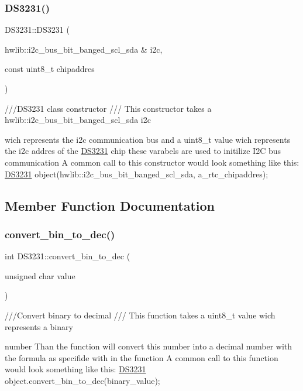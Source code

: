\subsubsection{\texorpdfstring{D\+S3231()}{DS3231()}}
{\footnotesize\ttfamily D\+S3231\+::\+D\+S3231 (\begin{DoxyParamCaption}\item[{hwlib\+::i2c\+\_\+bus\+\_\+bit\+\_\+banged\+\_\+scl\+\_\+sda \&}]{i2c,  }\item[{const uint8\+\_\+t}]{chipaddres }\end{DoxyParamCaption})}



///\+D\+S3231 class constructor  /// This constructor takes a hwlib\+::i2c\+\_\+bus\+\_\+bit\+\_\+banged\+\_\+scl\+\_\+sda i2c 

wich represents the i2c communication bus and a uint8\+\_\+t value wich represents the i2c addres of the \hyperlink{classDS3231}{D\+S3231} chip these varabels are used to initilize I2C bus communication A common call to this constructor would look something like this\+: \hyperlink{classDS3231}{D\+S3231} object(hwlib\+::i2c\+\_\+bus\+\_\+bit\+\_\+banged\+\_\+scl\+\_\+sda, a\+\_\+rtc\+\_\+chipaddres); 

\subsection{Member Function Documentation}
\mbox{\label{classDS3231_a505df2184898f9773d41ae8fde8e647a}} 
\subsubsection{\texorpdfstring{convert\+\_\+bin\+\_\+to\+\_\+dec()}{convert\_bin\_to\_dec()}}
{\footnotesize\ttfamily int D\+S3231\+::convert\+\_\+bin\+\_\+to\+\_\+dec (\begin{DoxyParamCaption}\item[{unsigned char}]{value }\end{DoxyParamCaption})}



///\+Convert binary to decimal  /// This function takes a uint8\+\_\+t value wich represents a binary 

number Than the function will convert this number into a decimal number with the formula as specifide with in the function A common call to this function would look something like this\+: \hyperlink{classDS3231}{D\+S3231} object.\+convert\+\_\+bin\+\_\+to\+\_\+dec(binary\+\_\+value); \mbox{\label{classDS3231_adbe3aa8366cf09b1ec1f7d0e4aa826db}} 
